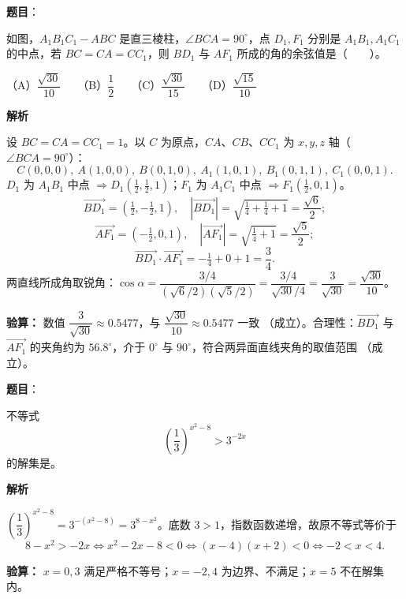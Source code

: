 \begin{answer}

\textbf{题目}：

如图，$A_1B_1C_1-ABC$ 是直三棱柱，$\angle BCA=90^\circ$，点 $D_1,F_1$ 分别是 $A_1B_1,A_1C_1$ 的中点，若 $BC=CA=CC_1$，则 $BD_1$ 与 $AF_1$ 所成的角的余弦值是\mbox{（　　）}。
\nopagebreak[4]
\begin{center}\end{center}
\nopagebreak[4]
（A）$\dfrac{\sqrt{30}}{10}$　　（B）$\dfrac12$　　（C）$\dfrac{\sqrt{30}}{15}$　　（D）$\dfrac{\sqrt{15}}{10}$

\textbf{解析}

设 $BC=CA=CC_1=1$。以 $C$ 为原点，$CA$、$CB$、$CC_1$ 为 $x,y,z$ 轴（$\angle BCA=90^\circ$）：
\nopagebreak[4]
\[C(0,0,0),\ A(1,0,0),\ B(0,1,0),\ A_1(1,0,1),\ B_1(0,1,1),\ C_1(0,0,1).\]
$D_1$ 为 $A_1B_1$ 中点 $\Rightarrow D_1\left(\tfrac12,\tfrac12,1\right)$；$F_1$ 为 $A_1C_1$ 中点 $\Rightarrow F_1\left(\tfrac12,0,1\right)$。
\nopagebreak[4]
\[\overrightarrow{BD_1}=\left(\tfrac12,-\tfrac12,1\right),\quad |\overrightarrow{BD_1}|=\sqrt{\tfrac14+\tfrac14+1}=\frac{\sqrt6}{2};\]
\nopagebreak[4]
\[\overrightarrow{AF_1}=\left(-\tfrac12,0,1\right),\quad |\overrightarrow{AF_1}|=\sqrt{\tfrac14+1}=\frac{\sqrt5}{2};\]
\nopagebreak[4]
\[\overrightarrow{BD_1}\cdot\overrightarrow{AF_1}=-\tfrac14+0+1=\frac34.\]
两直线所成角取锐角：$\cos\alpha=\dfrac{3/4}{(\sqrt6/2)(\sqrt5/2)}=\dfrac{3/4}{\sqrt{30}/4}=\dfrac{3}{\sqrt{30}}=\dfrac{\sqrt{30}}{10}$。

\textbf{验算：} 数值 $\dfrac{3}{\sqrt{30}}\approx0.5477$，与 $\dfrac{\sqrt{30}}{10}\approx0.5477$ 一致 （成立）。合理性：$\overrightarrow{BD_1}$ 与 $\overrightarrow{AF_1}$ 的夹角约为 $56.8^\circ$，介于 $0^\circ$ 与 $90^\circ$，符合两异面直线夹角的取值范围 （成立）。


\par\medskip

\end{answer}
\begin{answer}

\textbf{题目}：

不等式
\nopagebreak[4]
\[
\left(\dfrac13\right)^{x^2-8}>3^{-2x}
\]
的解集是\underline{\qquad\qquad}。

\textbf{解析}

$\left(\dfrac13\right)^{x^2-8}=3^{-(x^2-8)}=3^{8-x^2}$。底数 $3>1$，指数函数递增，故原不等式等价于
\nopagebreak[4]
\[8-x^2>-2x\iff x^2-2x-8<0\iff (x-4)(x+2)<0\iff -2<x<4.\]

\textbf{验算：} $x=0,3$ 满足严格不等号；$x=-2,4$ 为边界、不满足；$x=5$ 不在解集内。


\par\medskip

\end{answer}
